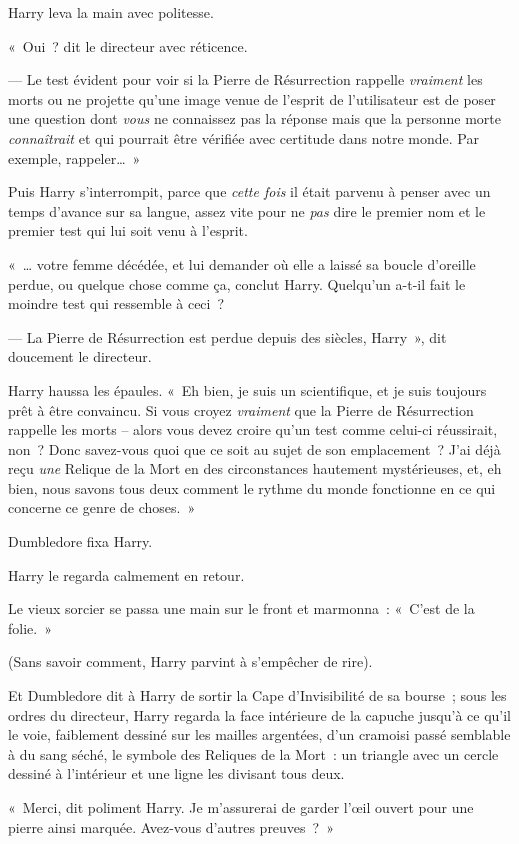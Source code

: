 Harry leva la main avec politesse.

«~Oui~? dit le directeur avec réticence.

--- Le test évident pour voir si la Pierre de Résurrection rappelle \emph{vraiment} les morts ou ne projette qu'une image venue de l'esprit de l'utilisateur est de poser une question dont \emph{vous} ne connaissez pas la réponse mais que la personne morte \emph{connaîtrait} et qui pourrait être vérifiée avec certitude dans notre monde.
Par exemple, rappeler…~»

Puis Harry s'interrompit, parce que \emph{cette fois} il était parvenu à penser avec un temps d'avance sur sa langue, assez vite pour ne \emph{pas} dire le premier nom et le premier test qui lui soit venu à l'esprit.

«~… votre femme décédée, et lui demander où elle a laissé sa boucle d'oreille perdue, ou quelque chose comme ça, conclut Harry.
Quelqu'un a-t-il fait le moindre test qui ressemble à ceci~?

--- La Pierre de Résurrection est perdue depuis des siècles, Harry~», dit doucement le directeur.

Harry haussa les épaules.
«~Eh bien, je suis un scientifique, et je suis toujours prêt à être convaincu.
Si vous croyez \emph{vraiment} que la Pierre de Résurrection rappelle les morts -- alors vous devez croire qu'un test comme celui-ci réussirait, non~?
Donc savez-vous quoi que ce soit au sujet de son emplacement~?
J'ai déjà reçu \emph{une} Relique de la Mort en des circonstances hautement mystérieuses, et, eh bien, nous savons tous deux comment le rythme du monde fonctionne en ce qui concerne ce genre de choses.~»

Dumbledore fixa Harry.

Harry le regarda calmement en retour.

Le vieux sorcier se passa une main sur le front et marmonna~: «~C'est de la folie.~»

(Sans savoir comment, Harry parvint à s'empêcher de rire).

Et Dumbledore dit à Harry de sortir la Cape d'Invisibilité de sa bourse~; sous les ordres du directeur, Harry regarda la face intérieure de la capuche jusqu'à ce qu'il le voie, faiblement dessiné sur les mailles argentées, d'un cramoisi passé semblable à du sang séché, le symbole des Reliques de la Mort~: un triangle avec un cercle dessiné à l'intérieur et une ligne les divisant tous deux.

«~Merci, dit poliment Harry.
Je m'assurerai de garder l'œil ouvert pour une pierre ainsi marquée.
Avez-vous d'autres preuves~?~»

